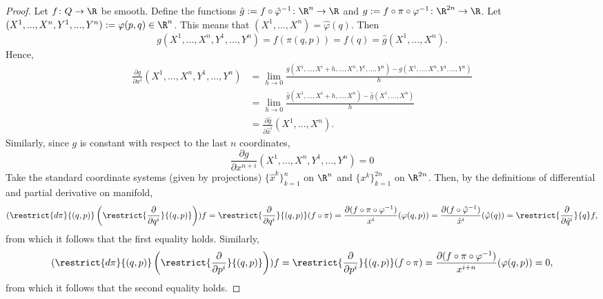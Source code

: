 \begin{proof}
  Let $f \colon Q \to \R$ be smooth.
  Define the functions
  $\hat{g} := f \circ \hat{\varphi}^{-1} \colon \R^n \to \R$ and
  $g := f \circ \pi \circ \varphi^{-1} \colon \R^{2 n} \to \R$.
  Let $(X^1, ..., X^n, Y^1, ..., Y^n) := \varphi(p, q) \in \R^n$.
  This means that $(X^1, ..., X^n) = \hat{\varphi}(q)$.
  Then
  \begin{equation}
    g(X^1, ..., X^n, Y^1, ..., Y^n)
    = f(\pi(q, p))
    = f(q)
    = \hat{g}(X^1, ..., X^n).
  \end{equation}
  Hence,
  \begin{equation}
    \begin{split}
      \frac{\partial g}{\partial x^i}(X^1, ..., X^n, Y^1, ..., Y^n)
      & = \lim_{h \to 0}
        \frac
        {g(X^1, ..., X^i + h, ..., X^n, Y^1, ..., Y^n)
         - g(X^1, ..., X^n, Y^1, ..., Y^n)}
        {h} \\
      & = \lim_{h \to 0}
        \frac{\hat{g}(X^1, ..., X^i + h, ..., X^n) - \hat{g}(X^1, ..., X^n)}{h}
        \\
      & = \frac{\partial \hat{g}}{\partial \hat{x}^i}(X^1, ..., X^n).
    \end{split}
  \end{equation}
  Similarly, since $g$ is constant with respect to the last $n$ coordinates,
  \begin{equation}
    \frac{\partial g}{\partial x^{n + i}}(X^1, ..., X^n, Y^1, ..., Y^n) = 0
  \end{equation}
  Take the standard coordinate systems (given by projections)
  $\{\hat{x}^k\}_{k = 1}^n$ on $\R^n$ and
  $\{x^k\}_{k = 1}^{2 n}$ on $\R^{2 n}$.
  Then, by the definitions of differential and partial derivative on manifold,
  \begin{equation}
    (\restrict{d \pi}{(q, p)}
      \left(\restrict{\frac{\partial}{\partial q^i}}{(q, p)}\right)) f
    = \restrict{\frac{\partial}{\partial q^i}}{(q, p)}(f \circ \pi)
    = \frac{\partial(f \circ \pi \circ \varphi^{-1})}{x^i}(\varphi(q, p))
    = \frac{\partial(f \circ \hat{\varphi}^{-1})}{\hat{x}^i}(\hat{\varphi}(q))
    = \restrict{\frac{\partial}{\partial \hat{q}^i}}{q} f,
  \end{equation}
  from which it follows that the first equality holds.
  Similarly,
  \begin{equation}
    (\restrict{d \pi}{(q, p)}
      \left(\restrict{\frac{\partial}{\partial p^i}}{(q, p)}\right)) f
    = \restrict{\frac{\partial}{\partial p^i}}{(q, p)}(f \circ \pi)
    = \frac{\partial(f \circ \pi \circ \varphi^{-1})}{x^{i + n}}(\varphi(q, p))
    = 0,
  \end{equation}
  from which it follows that the second equality holds.
\end{proof}
